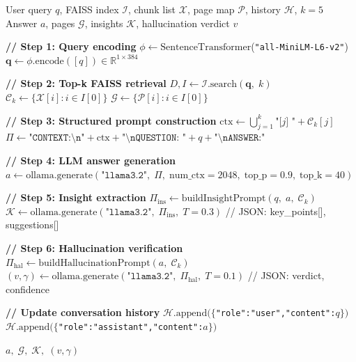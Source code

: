 \documentclass[conference]{IEEEtran}
\begin{document}
\begin{algorithm}[t]
\caption{DocMind AI — Query Processing Pipeline}
\label{alg:query}
\begin{algorithmic}[1]
\renewcommand{\algorithmicrequire}{\textbf{Input:}}
\renewcommand{\algorithmicensure}{\textbf{Output:}}
\REQUIRE User query $q$, FAISS index $\mathcal{I}$,
         chunk list $\mathcal{X}$, page map $\mathcal{P}$,
         history $\mathcal{H}$, $k=5$
\ENSURE  Answer $a$, pages $\mathcal{G}$, insights $\mathcal{K}$,
         hallucination verdict $v$

\STATE \textbf{// Step 1: Query encoding}
\STATE $\phi \leftarrow \mathrm{SentenceTransformer}$(\texttt{"all-MiniLM-L6-v2"})
\STATE $\mathbf{q} \leftarrow \phi.\mathrm{encode}([q])
       \in \mathbb{R}^{1 \times 384}$

\STATE \textbf{// Step 2: Top-k FAISS retrieval}
\STATE $D, I \leftarrow \mathcal{I}.\mathrm{search}(\mathbf{q},\; k)$
\STATE $\mathcal{C}_k \leftarrow \{\mathcal{X}[i] : i \in I[0]\}$
\STATE $\mathcal{G} \leftarrow \{\mathcal{P}[i] : i \in I[0]\}$

\STATE \textbf{// Step 3: Structured prompt construction}
\STATE $\mathrm{ctx} \leftarrow \bigcup_{j=1}^{k}
       \texttt{"[}j\texttt{] "} + \mathcal{C}_k[j]$
\STATE $\Pi \leftarrow \texttt{"CONTEXT:\textbackslash n"} +
       \mathrm{ctx} + \texttt{"\textbackslash nQUESTION: "} +
       q + \texttt{"\textbackslash nANSWER:"}$

\STATE \textbf{// Step 4: LLM answer generation}
\STATE $a \leftarrow \mathrm{ollama.generate}(\texttt{"llama3.2"},\;
       \Pi,\; \mathrm{num\_ctx}{=}2048,\;
       \mathrm{top\_p}{=}0.9,\; \mathrm{top\_k}{=}40)$

\STATE \textbf{// Step 5: Insight extraction}
\STATE $\Pi_{\mathrm{ins}} \leftarrow
       \mathrm{buildInsightPrompt}(q,\; a,\; \mathcal{C}_k)$
\STATE $\mathcal{K} \leftarrow \mathrm{ollama.generate}(
       \texttt{"llama3.2"},\; \Pi_{\mathrm{ins}},\;
       T{=}0.3)$
       \hspace{0.5em}// JSON: key\_points[], suggestions[]

\STATE \textbf{// Step 6: Hallucination verification}
\STATE $\Pi_{\mathrm{hal}} \leftarrow
       \mathrm{buildHallucinationPrompt}(a,\; \mathcal{C}_k)$
\STATE $(v,\gamma) \leftarrow \mathrm{ollama.generate}(
       \texttt{"llama3.2"},\; \Pi_{\mathrm{hal}},\; T{=}0.1)$
       \hspace{0.5em}// JSON: verdict, confidence

\STATE \textbf{// Update conversation history}
\STATE $\mathcal{H}.\mathrm{append}(\{$\texttt{"role":"user","content":}$q\})$
\STATE $\mathcal{H}.\mathrm{append}(\{$\texttt{"role":"assistant","content":}$a\})$

\RETURN $a,\; \mathcal{G},\; \mathcal{K},\; (v,\gamma)$
\end{algorithmic}
\end{algorithm}
\end{document}
